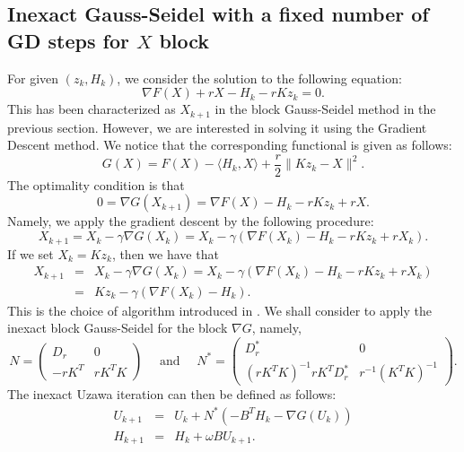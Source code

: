 \subsection{Inexact Gauss-Seidel with a fixed number of GD steps for $X$ block} 
For given $(z_k, H_k)$, we consider the solution to the following equation: 
\begin{equation}
\nabla F(X) + r X - H_k - r Kz_k = 0. 
\end{equation}
This has been characterized as $X_{k+1}$ in the block Gauss-Seidel method in the previous section. However, we are interested in solving it using the Gradient Descent method. We notice that the corresponding functional is given as follows: 
\begin{equation} 
G(X) = F(X) - \langle H_k, X \rangle + \frac{r}{2} \|Kz_k - X\|^2. 
\end{equation} 
The optimality condition is that 
\begin{equation} 
0 = \nabla G(X_{k+1}) = \nabla F(X) - H_k -r Kz_k + rX. 
\end{equation}
Namely, we apply the gradient descent by the following procedure: 
\begin{equation} 
X_{k+1} = X_k - \gamma \nabla G(X_k) = X_k - \gamma (\nabla F(X_k) - H_k - rKz_k + rX_k). 
\end{equation} 
If we set $X_k = Kz_k$, then we have that
\begin{eqnarray*} 
X_{k+1} &=& X_k - \gamma \nabla G(X_k) = X_k - \gamma (\nabla F(X_k) - H_k - rKz_k + rX_k) \\
&=& Kz_k - \gamma(\nabla F(X_k) - H_k).   
\end{eqnarray*}
This is the choice of algorithm introduced in \cite{mishchenko2022proxskip}.  
We shall consider to apply the inexact block Gauss-Seidel for the block $\nabla G$, namely, 
\begin{equation}
N = \begin{pmatrix}
D_r & 0\\
-r K^T & rK^T K 
\end{pmatrix} 
\quad \mbox{ and } \quad N^{*} = \begin{pmatrix}
D_r^{*} & 0\\
(r K^T K)^{-1} r K^T D_r^{*} & r^{-1} (K^T K)^{-1} 
\end{pmatrix}.  
\end{equation}
The inexact Uzawa iteration can then be defined as follows: 
\begin{eqnarray}
U_{k+1} &=& U_k + N^{*} (-B^T H_k - \nabla G(U_k)) \\
H_{k+1} &=& H_k + \omega B U_{k+1}. 
\end{eqnarray}

